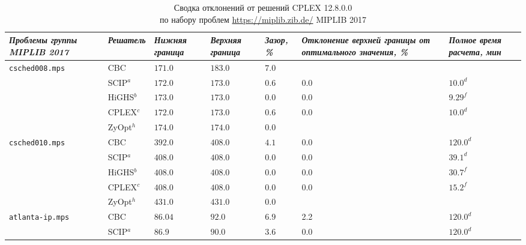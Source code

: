 \documentclass[%
	11pt,
	a4paper,
	utf8,
		]{article}
\begin{document}
\begin{landscape}
{%
    \begin{table}[!h]
    	\centering
    	\caption{Сводка отклонений от решений CPLEX 12.8.0.0\\ по набору проблем \url{https://miplib.zib.de/} MIPLIB 2017}
		\begin{tabular}{ p{3.3cm} | p{1.8cm} | p{1.8cm} | p{1.8cm} | p{1.6cm} | p{2.6cm} | p{2.5cm}}
			\emph{Проблемы группы MIPLIB 2017} & \emph{Решатель} & \emph{Нижняя граница} & \emph{Верхняя граница} & \emph{Зазор, \%} & \emph{Отклонение верхней границы от оптимального значения, \%} & \emph{Полное время расчета, мин} \\
			\hline\hline
			\rowcolor{blue!3}\texttt{csched008.mps} & CBC & $ 171.0 $ & $ 183.0 $ & $ 7.0 $ & \ccb{$ -5.8 $} & \ccb{$ 120.0^d $} \\
			\rowcolor{black!5}{$ - $} & SCIP$^a $ & $ 172.0 $ & $ 173.0 $ & $ 0.6 $ & 0.0 & $ 10.0^d $ \\
			\rowcolor{blue!3}{$ - $} & HiGHS$^b $ & $ 173.0 $ & $ 173.0 $ & $ 0.0 $ & 0.0 & $ 9.29^f $ \\
			\rowcolor{black!5}{$ - $} & CPLEX$^c $& $ 172.0 $ & $ 173.0 $ & $ 0.6 $ & 0.0 & $ 10.0^d $ \\
			\rowcolor{blue!3}{$ - $} & ZyOpt$ ^h $ & $ 174.0 $ & $ 174.0 $ & $ 0.0 $ & \ccb{$ -0.6^* $} & \ccg{$ 1.15^f (+88.5\%)$} \\
			\hline
			\rowcolor{blue!3}\texttt{csched010.mps} & CBC & $ 392.0 $ & $ 408.0 $ & $ 4.1 $ & 0.0 & $ 120.0^d $ \\
			\rowcolor{black!5}{$ - $} & SCIP$^a $ & $ 408.0 $ & $ 408.0 $ & $ 0.0 $ & 0.0 & $ 39.1^d $ \\
			\rowcolor{blue!3}{$ - $} & HiGHS$^b $ & $ 408.0 $ & $ 408.0 $ & $ 0.0 $ & 0.0 & $ 30.7^f $ \\
			\rowcolor{black!5}{$ - $} & CPLEX$^c $& $ 408.0 $ & $ 408.0 $ & $ 0.0 $ & 0.0 & $ 15.2^f $ \\
			\rowcolor{blue!3}{$ - $} & ZyOpt$ ^h $ & $ 431.0 $ & $ 431.0 $ & $ 0.0 $ & \ccb{$ -5.6^* $} & \ccg{$ 8.0^f (+47.4\%) $} \\
			\hline 
			\rowcolor{blue!3}\texttt{atlanta-ip.mps} & CBC & $ 86.04 $ & $ 92.0 $ & $ 6.9 $ & 2.2 & $ 120.0^d $ \\
			\rowcolor{black!5}{$ - $} & SCIP$^a $ & $ 86.9 $ & $ 90.0 $ & $ 3.6 $ & 0.0 & $ 120.0^d $ \\

\end{tabular}
\end{table}}
\end{landscape}
\end{document}

